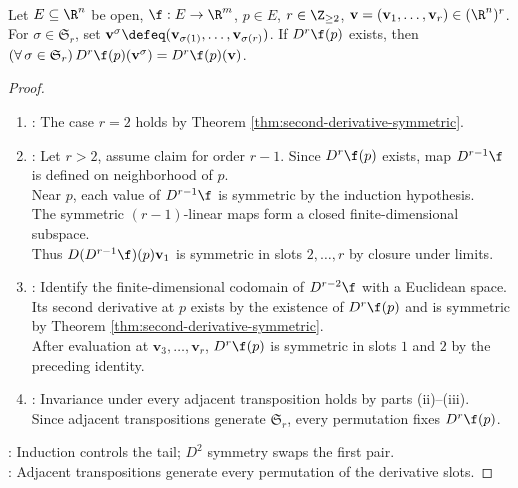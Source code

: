\begin{corollary} \label{cor:higher-derivatives-symmetric} \\
Let $E\subseteq\R^n$ be open, $\f:E\to\R^m$, $p\in E$, $r\in\Z_{\geq2}$, $\mathbf v=(\mathbf v_1,\ldots,\mathbf v_r)\in(\R^n)^r$.\\
For $\sigma\in\mathfrak S_r$, set $\mathbf v^\sigma\defeq(\mathbf v_{\sigma(1)},\ldots,\mathbf v_{\sigma(r)})$. If $D^r\f(p)$ exists, then $(\forall\,\sigma\in\mathfrak S_r)\,D^r\f(p)(\mathbf v^\sigma)=D^r\f(p)(\mathbf v)$.
\begin{proof}
\begin{enumerate}[label=(\roman*)]
\setlength{\itemsep}{0pt}
\item {}: The case $r=2$ holds by Theorem \ref{thm:second-derivative-symmetric}.
\item {}: Let $r>2$, assume claim for order $r-1$. Since $D^r\f(p)$ exists, map $D^{r-1}\f$ is defined on neighborhood of $p$.\\
Near $p$, each value of $D^{r-1}\f$ is symmetric by the induction hypothesis.\\
The symmetric $(r-1)$-linear maps form a closed finite-dimensional subspace.\\
Thus $D(D^{r-1}\f)(p)\mathbf v_1$ is symmetric in slots $2,\ldots,r$ by closure under limits.
\item {}: Identify the finite-dimensional codomain of $D^{r-2}\f$ with a Euclidean space.\\
Its second derivative at $p$ exists by the existence of $D^r\f(p)$ and is symmetric by Theorem \ref{thm:second-derivative-symmetric}.\\
After evaluation at $\mathbf v_3,\ldots,\mathbf v_r$, $D^r\f(p)$ is symmetric in slots $1$ and $2$ by the preceding identity.
\item {}: Invariance under every adjacent transposition holds by parts (ii)--(iii).\\
Since adjacent transpositions generate $\mathfrak S_r$, every permutation fixes $D^r\f(p)$.
\end{enumerate}
: Induction controls the tail; $D^2$ symmetry swaps the first pair.\\
: Adjacent transpositions generate every permutation of the derivative slots.
\end{proof}
\end{corollary}

